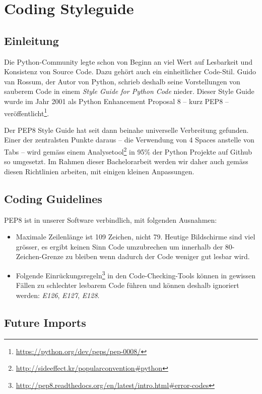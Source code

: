\section{Coding Styleguide}

\subsection{Einleitung}

Die Python-Community legte schon von Beginn an viel Wert auf Lesbarkeit und
Konsistenz von Source Code. Dazu gehört auch ein einheitlicher Code-Stil.  Guido
van Rossum, der Autor von Python, schrieb deshalb seine Vorstellungen von
sauberem Code in einem \textit{Style Guide for Python Code} nieder. Dieser Style
Guide wurde im Jahr 2001 als Python Enhancement Proposal 8 -- kurz PEP8 --
veröffentlicht\footnote{\url{https://python.org/dev/peps/pep-0008/}}.

Der PEP8 Style Guide hat seit dann beinahe universelle Verbreitung gefunden.
Einer der zentralsten Punkte daraus -- die Verwendung von 4 Spaces anstelle von
Tabs -- wird gemäss einem
Analysetool\footnote{\url{http://sideeffect.kr/popularconvention\#python}} in
95\% der Python Projekte auf Github so umgesetzt. Im Rahmen dieser Bachelorarbeit
werden wir daher auch gemäss diesen Richtlinien arbeiten, mit einigen kleinen
Anpassungen.

\subsection{Coding Guidelines}

PEP8 ist in unserer Software verbindlich, mit folgenden Ausnahmen:

\begin{itemize}
	\item Maximale Zeilenlänge ist 109 Zeichen, nicht 79. Heutige Bildschirme sind
		viel grösser, es ergibt keinen Sinn Code umzubrechen um innerhalb der
		80-Zeichen-Grenze zu bleiben wenn dadurch der Code weniger gut lesbar wird.
	\item Folgende
		Einrückungsregeln\footnote{\url{http://pep8.readthedocs.org/en/latest/intro.html\#error-codes}}
		in den Code-Checking-Tools können in gewissen Fällen zu schlechter lesbarem
		Code führen und können deshalb ignoriert werden: \textit{E126},
		\textit{E127}, \textit{E128}.
\end{itemize}


\subsection{Future Imports}

